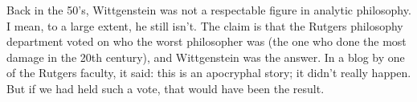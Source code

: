 Back in the 50's, Wittgenstein was not a respectable figure in analytic
philosophy. I mean, to a large extent, he still isn't. The claim is that the
Rutgers philosophy department voted on who the worst philosopher was (the one
who done the most damage in the 20th century), and Wittgenstein was the answer.
In a blog by one of the Rutgers faculty, it said: this is an apocryphal story;
it didn't really happen. But if we had held such a vote, that would have been
the result.
